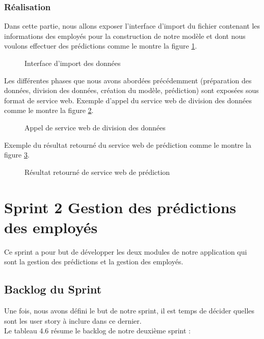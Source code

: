 \subsubsection{Réalisation}
Dans cette partie, nous allons exposer l'interface d'import du fichier contenant les informations des employés pour la construction de notre modèle et dont nous voulons effectuer des prédictions comme le montre la figure \ref{fig:importdata}.
\newpage
     \begin{figure}[htpb]
    \centering
    \caption{Interface d'import des données}
    \label{fig:importdata}
    \end{figure}

Les différentes phases que nous avons abordées précédemment (préparation des données, division des données, création du modèle, prédiction) sont exposées sous format de service web.
Exemple d'appel du service web de division des données comme le montre la figure \ref{fig:splitdata2}.

     \begin{figure}[htpb]
    \centering
    \caption{Appel de service web de division des données}
    \label{fig:splitdata2}
    \end{figure}

Exemple du résultat retourné du service web de prédiction comme le montre la figure \ref{fig:preddata}.
     \begin{figure}[htpb]
    \centering
    \caption{Résultat retourné de service web de prédiction}
    \label{fig:preddata}
    \end{figure}
    \newpage

\newpage
\section{Sprint 2 Gestion des prédictions des employés}
Ce sprint a pour but de développer les deux modules de notre application qui sont la gestion des prédictions et la gestion des employés.
\subsection{Backlog du Sprint}
Une fois, nous avons défini le but de notre sprint, il est temps de décider quelles sont les user story à inclure dans ce dernier.\\
Le tableau 4.6 résume le backlog de notre deuxième sprint :

